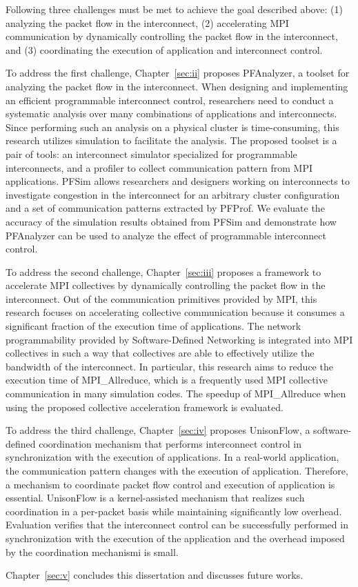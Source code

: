 Following three challenges must be met to achieve the goal described above:
(1) analyzing the packet flow in the interconnect, (2) accelerating MPI
communication by dynamically controlling the packet flow in the interconnect,
and (3) coordinating the execution of application and interconnect control.

To address the first challenge, Chapter~\ref{sec:ii} proposes PFAnalyzer, a
toolset for analyzing the packet flow in the interconnect. When designing and
implementing an efficient programmable interconnect control, researchers need
to conduct a systematic analysis over many combinations of applications and
interconnects. Since performing such an analysis on a physical cluster is
time-consuming, this research utilizes simulation to facilitate the analysis.
The proposed toolset is a pair of tools: an interconnect simulator
specialized for programmable interconnects, and a profiler to collect
communication pattern from MPI applications. PFSim allows researchers and
designers working on interconnects to investigate congestion in the
interconnect for an arbitrary cluster configuration and a set of communication
patterns extracted by PFProf. We evaluate the accuracy of the simulation
results obtained from PFSim and demonstrate how PFAnalyzer can be used to
analyze the effect of programmable interconnect control.

To address the second challenge, Chapter~\ref{sec:iii} proposes a framework to
accelerate MPI collectives by dynamically controlling the packet flow in the
interconnect. Out of the communication primitives provided by MPI, this
research focuses on accelerating collective communication because it consumes
a significant fraction of the execution time of applications. The network
programmability provided by Software-Defined Networking is integrated into MPI
collectives in such a way that collectives are able to effectively utilize the
bandwidth of the interconnect. In particular, this research aims to reduce the
execution time of MPI\_Allreduce, which is a frequently used MPI collective
communication in many simulation codes. The speedup of MPI\_Allreduce when
using the proposed collective acceleration framework is evaluated.

To address the third challenge, Chapter~\ref{sec:iv} proposes UnisonFlow, a
software-defined coordination mechanism that performs interconnect control in
synchronization with the execution of applications. In a real-world
application, the communication pattern changes with the execution of
application. Therefore, a mechanism to coordinate packet flow control and
execution of application is essential. UnisonFlow is a kernel-assisted
mechanism that realizes such coordination in a per-packet basis while
maintaining significantly low overhead. Evaluation verifies that the
interconnect control can be successfully performed in synchronization with the
execution of the application and the overhead imposed by the coordination
mechanismi is small.

Chapter~\ref{sec:v} concludes this dissertation and discusses future works.

\pagestyle{headings}

